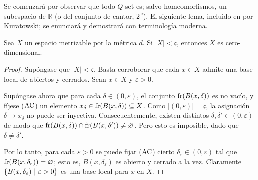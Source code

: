 Se comenzará por observar que todo $Q$-set es; salvo homeomorfismos, un subespacio de $\mathbb{R}$ (o del conjunto de cantor, $2^\omega$). El siguiente lema, incluido en \cite[Teo.~1, p.~286]{kuratowskiTopology} por Kuratowski; se enunciará y demostrará con terminología moderna.
\begin{lema}
	Sea $X$ un espacio metrizable por la métrica $d$. Si $|X|<\mathfrak{c}$, entonces $X$ es cero-dimensional.
\end{lema}
\begin{proof}
	Supóngase que $|X|<\mathfrak{c}$. Basta corroborar que cada $x \in X$ admite una base local de abiertos y cerrados. Sean $x \in X$ y $\varepsilon>0$.

	Supóngase ahora que para cada $\delta \in (0,\varepsilon)$, el conjunto $\operatorname{fr}(B(x,\delta))$ es no vacío, y fíjese ($\operatorname{AC}$) un elemento $x_\delta \in \operatorname{fr}(B(x,\delta)) \subseteq X$. Como $|(0,\varepsilon)|=\mathfrak{c}$, la asignación $\delta \to x_\delta$ no puede ser inyectiva. Consecuentemente, existen distintos $\delta,\delta'\in (0,\varepsilon)$ de modo que $\operatorname{fr}(B(x,\delta)) \cap \operatorname{fr}(B(x,\delta')) \neq \varnothing$. Pero esto es imposible, dado que $\delta \neq \delta'$.

	Por lo tanto, para cada $\varepsilon>0$ se puede fijar ($\operatorname{AC}$) cierto $\delta_\varepsilon \in (0,\varepsilon)$ tal que $\operatorname{fr}(B(x,\delta_\varepsilon))=\varnothing$; esto es, $B(x,\delta_\varepsilon)$ es abierto y cerrado a la vez. Claramente $\{B(x,\delta_\varepsilon) \text{ $|$ } \varepsilon>0\}$ es una base local para $x$ en $X$.
\end{proof}

